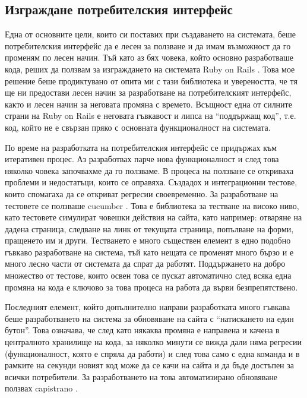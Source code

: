 \documentclass[a4paper,12pt]{article}
\begin{document}
  \subsection{Изграждане потребителския интерфейс}
    Една от основните цели, които си поставих при създаването на системата, беше потребителския интерфейс да е лесен за ползване и да имам възможност да го променям по лесен начин. Тъй като аз бях човека, който основно разработваше кода, реших да ползвам за изграждането на системата Ruby on Rails \cite{rubyonrails_site}. Това мое решение беше продиктувано от опита ми с тази библиотека и увереността, че тя ще ни предостави лесен начин за разработване на потребителският интерфейс, както и лесен начин за неговата промяна с времето. Всъщност една от силните страни на Ruby on Rails е неговата гъвкавост и липса на ``поддържащ код'', т.е. код, който не е свързан пряко с основната функционалност на системата.
    
    По време на разработката на потребителския интерфейс се придържах към итеративен процес. Аз разработвах парче нова функционалност и след това няколко човека започвахме да го ползваме. В процеса на ползване се откриваха проблеми и недостатъци, които се оправяха. Създадох и интеграционни тестове, които спомагаха да се откриват регресии своевременно. За разработване на тестовете се ползваше cucumber \cite{cucumber_site}. Това е библиотека за тестване на високо ниво, като тестовете симулират човешки действия на сайта, като например: отваряне на дадена страница, следване на линк от текущата страница, попълване на форми, пращенето им и други. Тестването е много съществен елемент в едно подобно гъвкаво разработване на система, тъй като нещата се променят много бързо и е много лесно части от системата да спрат да работят. Поддържането на добро множество от тестове, които освен това се пускат автоматично след всяка една промяна на кода е ключово за това процеса на работа да върви безпрепятствено.
    
    Последният елемент, който допълнително направи разработката много гъвкава беше разработването на система за обновяване на сайта с ``натискането на един бутон''. Това означава, че след като някаква промяна е направена и качена в централното хранилище на кода, за няколко минути се вижда дали няма регресии (функционалност, която е спряла да работи) и след това само с една команда и в рамките на секунди новият код може да се качи на сайта и да бъде достъпен за всички потребители. За разработването на това автоматизирано обновяване ползвах capistrano \cite{capistrano_site}.
    
\end{document}
